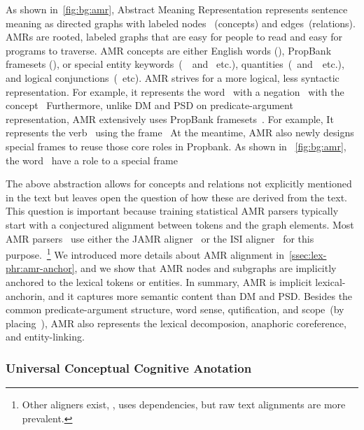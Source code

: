 As shown in~\autoref{fig:bg:amr}, Abstract Meaning Representation
represents sentence meaning as directed graphs with labeled nodes
~(concepts) and edges~(relations). AMRs are rooted, labeled graphs
that are easy for people to read and easy for programs to traverse.
AMR concepts are either English words (), PropBank
framesets (), or special entity
keywords~(~~and~
etc.), quantities~(~and~~etc.), and logical
conjunctions~(~etc).  AMR strives for a more logical,
less syntactic representation. For example, it represents the
word~ with a negation~
with the concept~ Furthermore, unlike DM and PSD
on predicate-argument representation, AMR extensively uses PropBank
framesets~\citep{Kin:Pal:02, palmer2005proposition}. For example, It
represents the verb~ using the
frame~ At the meantime, AMR also newly designs
special frames to reuse those core roles in Propbank. As shown in
~\autoref{fig:bg:amr}, the word~ have a role
 to a special frame~

The above abstraction allows for concepts and relations not explicitly
mentioned in the text but leaves open the question of how these are
derived from the text. This question is important because training
statistical AMR parsers typically start with a conjectured alignment
between tokens and the graph elements. Most AMR
parsers~\cite[\eg,][]{Flanigan:2014vc,Wang:2015uo,Artzi:2009tb,Pust:2015ug,Peng:2015tj,Konstas:2017uj,Wang:2017vt}
use either the JAMR aligner~\cite{Flanigan:2014vc} or the ISI
aligner~\cite{Pourdamghani:2014aligning} for this
purpose.~\footnote{Other aligners exist, \eg,
  \citet{chen2017unsupervised} uses dependencies, but raw text
  alignments are more prevalent.}  We introduced more details about
AMR alignment in~\autoref{ssec:lex-phr:amr-anchor}, and we show that
AMR nodes and subgraphs are implicitly anchored to the lexical tokens
or entities. In summary, AMR is implicit lexical-anchorin, and it
captures more semantic content than DM and PSD. Besides the common
predicate-argument structure, word sense, qutification, and scope~(by
placing~), AMR also represents the lexical
decomposion, anaphoric coreference, and entity-linking.

\subsubsection{Universal Conceptual Cognitive Anotation}
\label{ssec:bg:ucca}

